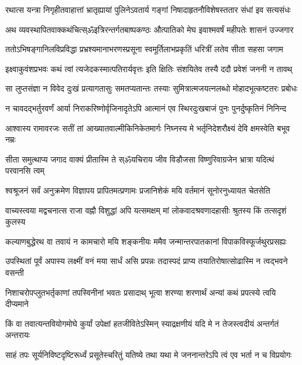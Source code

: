 \twolineshloka
{रथात्स यन्त्रा निगृहीतवाहात्तां भ्रातृह्यायां पुलिनेऽवतार्य}
{गङ्गां निषादाहृतनौविशेषस्ततार संधां इव सत्यसंधः}%

\twolineshloka
{अथ व्यवस्थापितवाक्कथंचित्स्ॐइत्रिरन्तर्गतबाष्पकण्ठः}
{औत्पातिको मेघ इवाश्मवर्षं महीपतेः शासनं उज्जगार}%

\twolineshloka
{ततोऽभिषङ्गानिलविप्रविद्धा प्रभ्रश्यमानाभरणस्प्रसूना}
{स्वमूर्तिलाभप्रकृतिं धरित्रीं लतेव सीता सहसा जगाम}%

\twolineshloka
{इक्ष्वाकुवंशप्रभवः कथं त्वां त्यजेदकस्मात्पतिरार्यवृत्तः}
{इति क्षितिः संशयितेव तस्यै ददौ प्रवेशं जननी न तावथ्}%

\twolineshloka
{सा लुप्तसंज्ञा न विवेद दुःखं प्रत्यागतासुः समतप्यतान्तः}
{तस्याः सुमित्रात्मजयत्नलब्धो मोहादभूत्कष्टतरः प्रबोधः}%

\twolineshloka
{न चावदद्भर्तुरवर्णं आर्या निराकरिष्णोर्वृजिनादृतेऽपि}
{आत्मानं एव स्थिरदुःखबाजं पुनः पुनर्दुष्कृतिनं निनिन्द}%

\twolineshloka
{आश्वास्य रामावरजः सतीं तां आख्यातवाल्मीकिनिकेतमार्गः}
{निघ्नस्य मे भर्तृनिदेशरौक्ष्यं देवि क्षमस्वेति बभूव नम्रः}%

\twolineshloka
{सीता समुत्थाप्य जगाद वाक्यं प्रीतास्मि ते स्ॐयचिराय जीव}
{विडौजसा विष्णुरिवाग्रजेन भ्रात्रा यदित्थं परवानसि त्वम्}%

\twolineshloka
{श्वश्रूजनं सर्वं अनुक्रमेण विज्ञापय प्रापितमत्प्रणामः}
{प्रजानिशेकं मयि वर्तमानं सूनोरनुध्यायत चेतसेति}%

\twolineshloka
{वाच्यस्त्वया मद्वचनात्स राजा वह्नौ विशुद्धां अपि यत्समक्षम्}
{मां लोकवादश्रवणादहासीः श्रुतस्य किं तत्सदृशं कुलस्य}%

\twolineshloka
{कल्याणबुद्धेरथ वा तवायं न कामचारो मयि शङ्कनीयः}
{ममैव जन्मान्तरपातकानां विपाकविस्फूर्जथुरप्रसह्यः}%

\twolineshloka
{उपस्थितां पूर्वं अपास्य लक्ष्मीं वनं मया सार्धं असि प्रपन्नः}
{तदास्पदं प्राप्य तयातिरोषात्सोढास्मि न त्वद्भवने वसन्ती}%

\twolineshloka
{निशाचरोपप्लुतभर्तृकाणां तपस्विनीनां भवतः प्रसादाथ्}
{भूत्वा शरण्या शरणार्थं अन्यां कथं प्रपत्स्ये त्वयि दीप्यमाने}%

\twolineshloka
{किं वा तवात्यन्तवियोगमोघे कुर्यां उपेक्षां हतजीवितेऽस्मिन्}
{स्याद्रक्षणीयं यदि मे न तेजस्त्वदीयं अन्तर्गतं अन्तरायः}%

\twolineshloka
{साहं तपः सूर्यनिविष्टदृष्टिरूर्ध्वं प्रसूतेस्चरितुं यतिष्ये}
{तथा यथा मे जननान्तरेऽपि त्वं एव भर्ता न च विप्रयोगः}%

